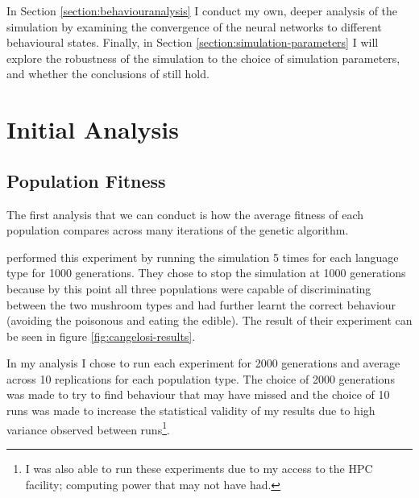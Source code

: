 \documentclass[12pt,a4paper,twoside,openright]{report}
\begin{document}
In Section \ref{section:behaviouranalysis} I conduct my own, deeper analysis of the simulation by examining the convergence of the neural networks to different behavioural states. Finally, in Section \ref{section:simulation-parameters} I will explore the robustness of the simulation to the choice of simulation parameters, and whether the conclusions of \citet{Cangelosi1998} still hold.

\section{Initial Analysis}

\subsection{Population Fitness}\label{section:popfit}

 

 
The first analysis that we can conduct is how the average fitness of each population compares across many iterations of the genetic algorithm.

\citet{Cangelosi1998} performed this experiment by running the simulation 5 times for each language type for 1000 generations. They chose to stop the simulation at 1000 generations because by this point all three populations were capable of discriminating between the two mushroom types and had further learnt the correct behaviour (avoiding the poisonous and eating the edible). The result of their experiment can be seen in figure \ref{fig:cangelosi-results}.

In my analysis I chose to run each experiment for 2000 generations and average across 10 replications for each population type. The choice of 2000 generations was made to try to find behaviour that \citet{Cangelosi1998} may have missed and the choice of 10 runs was made to increase the statistical validity of my results due to high variance observed between runs\footnote{I was also able to run these experiments due to my access to the HPC facility; computing power that \citet{Cangelosi1998} may not have had.}. 
\end{document}
